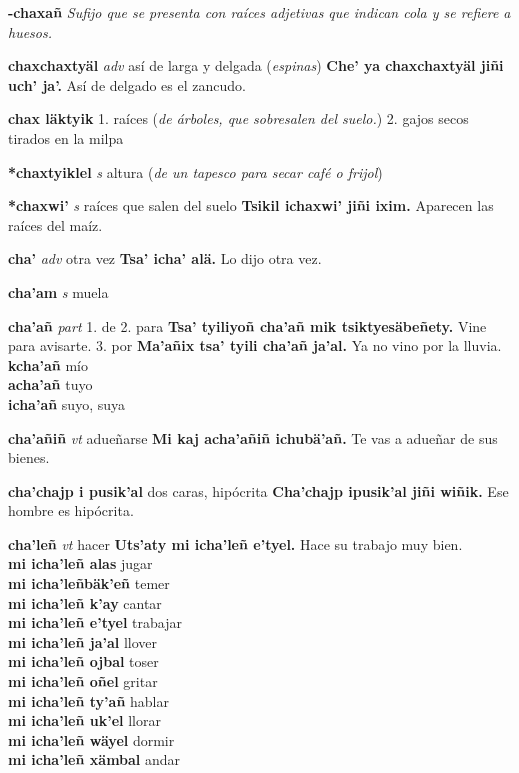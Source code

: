 \documentclass[10pt]{scrbook}
\newcommand{\entry}[1]{\textbf{#1}}
\newcommand{\onedefinition}[1]{#1.}
\newcommand{\nontranslationdef}[1]{\textit{#1}}
\newcommand{\partofspeech}[1]{\textit{#1}}
\newcommand{\spanishtranslation}[1]{#1}
\newcommand{\clarification}[1]{(\textit{#1})}
\newcommand{\cholexample}[1]{\textbf{#1}}
\newcommand{\exampletranslation}[1]{#1}
\newcommand{\secondaryentry}[1]{\\\textbf{#1}}
\newcommand{\secondtranslation}[1]{#1}
\begin{document}
\begin{multicols}{2}
\entry{-chaxañ}
\nontranslationdef{Sufijo que se presenta con raíces adjetivas que indican cola y se refiere a huesos.}

\entry{chaxchaxtyäl}
\partofspeech{adv}
\spanishtranslation{así de larga y delgada}
\clarification{espinas}
\cholexample{Che' ya chaxchaxtyäl jiñi uch' ja'.}
\exampletranslation{Así de delgado es el zancudo.}

\entry{chax läktyik}
\onedefinition{1}
\spanishtranslation{raíces}
\clarification{de árboles, que sobresalen del suelo.}
\onedefinition{2}
\spanishtranslation{gajos secos tirados en la milpa}

\entry{*chaxtyiklel}
\partofspeech{s}
\spanishtranslation{altura}
\clarification{de un tapesco para secar café o frijol}

\entry{*chaxwi'}
\partofspeech{s}
\spanishtranslation{raíces que salen del suelo}
\cholexample{Tsikil ichaxwi' jiñi ixim.}
\exampletranslation{Aparecen las raíces del maíz.}

\entry{cha'}
\partofspeech{adv}
\spanishtranslation{otra vez}
\cholexample{Tsa' icha' alä.}
\exampletranslation{Lo dijo otra vez.}

\entry{cha'am}
\partofspeech{s}
\spanishtranslation{muela}

\entry{cha'añ}
\partofspeech{part}
\onedefinition{1}
\spanishtranslation{de}
\onedefinition{2}
\spanishtranslation{para}
\cholexample{Tsa' tyiliyoñ cha'añ mik tsiktyesäbeñety.}
\exampletranslation{Vine para avisarte.}
\onedefinition{3}
\spanishtranslation{por}
\cholexample{Ma'añix tsa' tyili cha'añ ja'al.}
\exampletranslation{Ya no vino por la lluvia.}
\secondaryentry{kcha'añ}
\secondtranslation{mío}
\secondaryentry{acha'añ}
\secondtranslation{tuyo}
\secondaryentry{icha'añ}
\secondtranslation{suyo, suya}

\entry{cha'añiñ}
\partofspeech{vt}
\spanishtranslation{adueñarse}
\cholexample{Mi kaj acha'añiñ ichubä'añ.}
\exampletranslation{Te vas a adueñar de sus bienes.}

\entry{cha'chajp i pusik'al}
\spanishtranslation{dos caras, hipócrita}
\cholexample{Cha'chajp ipusik'al jiñi wiñik.}
\exampletranslation{Ese hombre es hipócrita.}

\entry{cha'leñ}
\partofspeech{vt}
\spanishtranslation{hacer}
\cholexample{Uts'aty mi icha'leñ e'tyel.}
\exampletranslation{Hace su trabajo muy bien.}
\secondaryentry{mi icha'leñ alas}
\secondtranslation{jugar}
\secondaryentry{mi icha'leñbäk'eñ}
\secondtranslation{temer}
\secondaryentry{mi icha'leñ k'ay}
\secondtranslation{cantar}
\secondaryentry{mi icha'leñ e'tyel}
\secondtranslation{trabajar}
\secondaryentry{mi icha'leñ ja'al}
\secondtranslation{llover}
\secondaryentry{mi icha'leñ ojbal}
\secondtranslation{toser}
\secondaryentry{mi icha'leñ oñel}
\secondtranslation{gritar}
\secondaryentry{mi icha'leñ ty'añ}
\secondtranslation{hablar}
\secondaryentry{mi icha'leñ uk'el}
\secondtranslation{llorar}
\secondaryentry{mi icha'leñ wäyel}
\secondtranslation{dormir}
\secondaryentry{mi icha'leñ xämbal}
\secondtranslation{andar}


\end{multicols}
\end{document}
